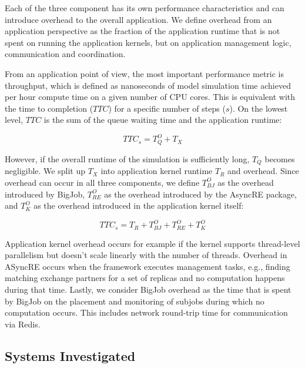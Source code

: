 \documentclass{sig-alternate}
\begin{document}
Each of the three component has its own performance characteristics and 
can introduce overhead to the overall application. We define overhead from an 
application perspective as the fraction of the application runtime that is 
not spent on running the application kernels, but on application management 
logic, communication and coordination.

From an application point of view, the most important performance metric 
is throughput, which is defined as nanoseconds of model simulation time 
achieved per hour compute time on a given number of CPU cores. This is 
equivalent with the time to completion ($TTC$) for a specific number of 
steps ($s$). On the lowest level, $TTC$ is the sum of the queue waiting time and 
the application runtime:

$$ TTC_s = T^{O}_Q + T_X $$

However, if the overall runtime of the simulation is sufficiently long, 
$T_Q$ becomes negligible. We split up $T_X$ into application 
kernel runtime $T_R$ and overhead. Since overhead can occur in all three
components, we define $T^{O}_{BJ}$ as the overhead introduced by BigJob,
$T^{O}_{RE}$ as the overhead introduced by the AsyncRE package, and 
$T^{O}_{K}$ as the overhead introduced in the application kernel itself:

$$ TTC_s = T_R + T^{O}_{BJ} + T^{O}_{RE} + T^{O}_{K}$$

Application kernel overhead occurs for example if the kernel supports 
thread-level parallelism but doesn't scale linearly with the number of 
threads. Overhead in ASyncRE occurs when the framework executes management 
tasks, e.g., finding matching exchange partners for a set of replicas and 
no computation happens during that time. Lastly, we consider BigJob 
overhead as the time that is spent by BigJob on the placement and monitoring 
of subjobs during which no computation occurs. This includes network
round-trip time for communication via Redis.




\subsection{Systems Investigated} 
\end{document}
